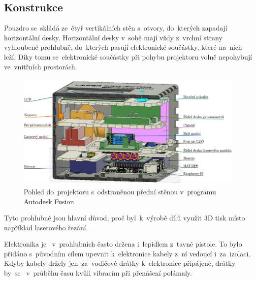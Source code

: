 \subsection{Konstrukce}
Pouzdro se~skládá ze~čtyř vertikálních stěn s~otvory, do~kterých zapadají horizontální desky. Horizontální desky v~sobě mají vždy z~vrchní strany vyhloubené prohlubně, do~kterých pasují elektronické součástky, které na~nich leží. Díky tomu se~elektronické součástky při pohybu projektoru volně nepohybují ve~vnitřních prostorách.

\begin{figure}[htb]
  \centering
  \includegraphics[width=1\textwidth]{img/case-sideview.jpg}
  \caption{\label{fig:case-sideview} Pohled do~projektoru  s~odstraněnou přední stěnou  v~programu Autodesk Fusion}
\end{figure}

Tyto prohlubně jsou hlavní důvod, proč  byl~k~výrobě dílů využit 3D tisk místo například laserového řezání.

Elektronika je ~v~prohlubních často držena  i~lepidlem z~tavné pistole.
To bylo přidáno  s~původním cílem upevnit  k~elektronice kabely z~ní vedoucí  i~za~izolaci. Kdyby kabely držely  jen~za~vodičové drátky  k~elektronice připájené, drátky by~se ~v~průběhu času kvůli vibracím při přenášení polámaly.

